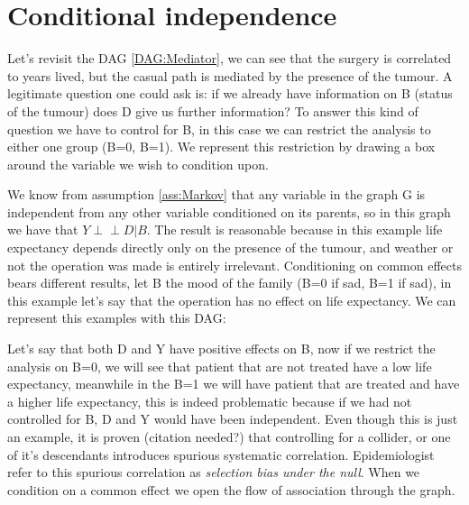 \section{Conditional independence}
Let's revisit the DAG \ref{DAG:Mediator}, we can see that the surgery is correlated to years lived, but the casual path is mediated by the presence of the tumour. A legitimate question one could ask is: if we already have information on B (status of the tumour) does D give us further information? To answer this kind of question we have to control for B, in this case we can restrict the analysis to either one group (B=0, B=1). We represent this restriction by drawing a box around the variable we wish to condition upon. 
\begin{figure}[H]
\centering
{}
\end{figure}
We know from assumption \ref{ass:Markov} that any variable in the graph G is independent from any other variable conditioned on its parents, so in this graph we have that $Y \perp\!\!\!\perp D | B$. The result is reasonable  because in this example life expectancy depends directly only on the presence of the tumour, and weather or not the operation was made is entirely irrelevant. 
Conditioning on common effects bears different results, let B the mood of the family (B=0 if sad, B=1 if sad), in this example let's say that the operation has no effect on life expectancy. We can represent this examples with this DAG:
\begin{figure}[H]
\centering
{}
\end{figure}
Let's say that both D and Y have positive effects on B, now if we restrict the analysis on B=0, we will see that patient that are not treated have a low life expectancy, meanwhile in the B=1 we will have patient that are treated and have a higher life expectancy, this is indeed problematic because if we had not controlled for B, D and Y would have been independent. Even though this is just an example, it is proven (citation needed?) that controlling for a collider, or one of it's descendants introduces spurious systematic correlation. Epidemiologist refer to this spurious correlation as \textit{selection bias under the null}. When we condition on a common effect we open the flow of association through the graph.
